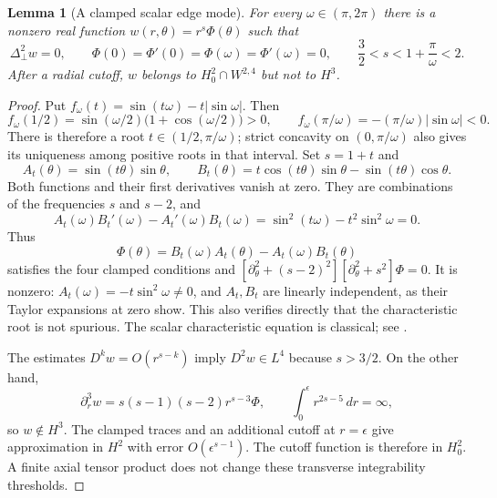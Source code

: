 \documentclass[11pt,a4paper]{article}
\newtheorem{lemma}[theorem]{Lemma}
\theoremstyle{remark}
\numberwithin{equation}{section}
\begin{document}
\begin{lemma}[A clamped scalar edge mode]\label{lem:scalar-edge}
For every $\omega\in(\pi,2\pi)$ there is a nonzero real function
$w(r,\theta)=r^s\Phi(\theta)$ such that
\[
 \Delta_\perp^2w=0,\qquad
 \Phi(0)=\Phi'(0)=\Phi(\omega)=\Phi'(\omega)=0,\qquad
 \frac32<s<1+\frac{\pi}{\omega}<2.
\]
After a radial cutoff, $w$ belongs to $H^2_0\cap W^{2,4}$ but not to $H^3$.
\end{lemma}
\begin{proof}
Put $f_\omega(t)=\sin(t\omega)-t|\sin\omega|$.  Then
\[
 f_\omega(1/2)
 =\sin(\omega/2)\bigl(1+\cos(\omega/2)\bigr)>0,\qquad
 f_\omega(\pi/\omega)=-(\pi/\omega)|\sin\omega|<0.
\]
There is therefore a root $t\in(1/2,\pi/\omega)$; strict concavity on
$(0,\pi/\omega)$ also gives its uniqueness among positive roots in that
interval.  Set $s=1+t$ and
\[
 A_t(\theta)=\sin(t\theta)\sin\theta,\qquad
 B_t(\theta)=t\cos(t\theta)\sin\theta-\sin(t\theta)\cos\theta .
\]
Both functions and their first derivatives vanish at zero.  They are
combinations of the frequencies $s$ and $s-2$, and
\[
 A_t(\omega)B_t'(\omega)-A_t'(\omega)B_t(\omega)
 =\sin^2(t\omega)-t^2\sin^2\omega=0.
\]
Thus
\[
 \Phi(\theta)=B_t(\omega)A_t(\theta)-A_t(\omega)B_t(\theta)
\]
satisfies the four clamped conditions and
$[\partial_\theta^2+(s-2)^2][\partial_\theta^2+s^2]\Phi=0$.
It is nonzero: $A_t(\omega)=-t\sin^2\omega\ne0$, and $A_t,B_t$
are linearly independent, as their Taylor expansions at zero show.
This also verifies directly that the characteristic root is not spurious.
The scalar characteristic equation is classical; see
\cite[(4.3)--(4.5)]{BacutaBramblePasciak2002}.

The estimates $D^kw=O(r^{s-k})$ imply $D^2w\in L^4$ because $s>3/2$.
On the other hand,
\[
 \partial_r^3w=s(s-1)(s-2)r^{s-3}\Phi,\qquad
 \int_0^\epsilon r^{2s-5}\,dr=\infty ,
\]
so $w\notin H^3$.  The clamped traces and an additional cutoff at $r=\epsilon$
give approximation in $H^2$ with error $O(\epsilon^{s-1})$.
The cutoff function is therefore in $H^2_0$.  A finite axial tensor product
does not change these transverse integrability thresholds.
\end{proof}
\end{document}
